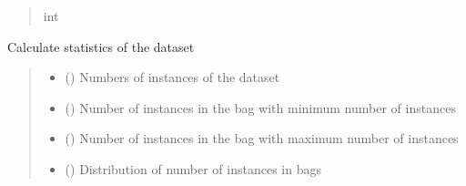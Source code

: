 \documentclass[letterpaper,10pt,english]{sphinxmanual}
\begin{document}
\begin{fulllineitems}
\begin{fulllineitems}
\begin{quote}
\begin{description}
\sphinxAtStartPar
int

\end{description}\end{quote}

\end{fulllineitems}


\begin{fulllineitems}
\label{\detokenize{data/_autosummary/miml.data.miml_dataset.MIMLDataset:miml.data.miml_dataset.MIMLDataset.get_statistics}}
\pysigstartsignatures
\pysiglinewithargsret
{}
{}
{}
\pysigstopsignatures
\sphinxAtStartPar
Calculate statistics of the dataset
\begin{quote}\begin{description}
\sphinxAtStartPar
\begin{itemize}
\item {} 
\sphinxAtStartPar
{} () \textendash{} Numbers of instances of the dataset

\item {} 
\sphinxAtStartPar
{} () \textendash{} Number of instances in the bag with minimum number of instances

\item {} 
\sphinxAtStartPar
{} () \textendash{} Number of instances in the bag with maximum number of instances

\item {} 
\sphinxAtStartPar
{} () \textendash{} Distribution of number of instances in bags

\end{itemize}


\end{description}\end{quote}

\end{fulllineitems}



\end{fulllineitems}
\end{document}
